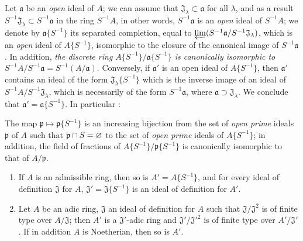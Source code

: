 \begin{env}[7.6.9]
\label{0.7.6.9}
Let $\mathfrak{a}$ be an \emph{open} ideal of $A$; we can assume that
$\mathfrak{J}_\lambda\subset\mathfrak{a}$ for all $\lambda$, and as a result
$S^{-1}\mathfrak{J}_\lambda\subset S^{-1}\mathfrak{a}$ in the ring $S^{-1}A$, in other words,
$S^{-1}\mathfrak{a}$ is an \emph{open} ideal of $S^{-1}A$; we denote by $\mathfrak{a}\{S^{-1}\}$ its
separated completion, equal to $\varprojlim(S^{-1}\mathfrak{a}/S^{-1}\mathfrak{J}_\lambda)$, which is
an \emph{open} ideal of $A\{S^{-1}\}$, isomorphic to the closure of the canonical image of
$S^{-1}\mathfrak{a}$. In addition, \emph{the discrete ring $A\{S^{-1}\}/\mathfrak{a}\{S^{-1}\}$ is
canonically isomorphic to $S^{-1}A/S^{-1}\mathfrak{a}=S^{-1}(A/\mathfrak{a})$}. Conversely, if
$\mathfrak{a}'$ is an open ideal of $A\{S^{-1}\}$, then $\mathfrak{a}'$ contains an ideal of the
form $\mathfrak{J}_\lambda\{S^{-1}\}$ which is the inverse image of an ideal of
$S^{-1}A/S^{-1}\mathfrak{J}_\lambda$, which is necessarily  of the
form $S^{-1}\mathfrak{a}$, where $\mathfrak{a}\supset\mathfrak{J}_\lambda$. We conclude that
$\mathfrak{a}'=\mathfrak{a}\{S^{-1}\}$. In particular :
\end{env}

\begin{proposition}[7.6.10]
\label{0.7.6.10}
The map $\mathfrak{p}\mapsto\mathfrak{p}\{S^{-1}\}$ is an increasing bijection from the set of
\emph{open prime} ideals $\mathfrak{p}$ of $A$ such that $\mathfrak{p}\cap S=\varnothing$ to the set
of \emph{open prime} ideals
of $A\{S^{-1}\}$; in addition, the field of fractions of $A\{S^{-1}\}/\mathfrak{p}\{S^{-1}\}$ is
canonically isomorphic to that of $A/\mathfrak{p}$.
\end{proposition}

\begin{proposition}[7.6.11]
\label{0.7.6.11}
\medskip\noindent
\begin{enumerate}[label=\emph{(\roman*)}]
  \item If $A$ is an admissible ring, then so is $A'=A\{S^{-1}\}$, and for every ideal
    of definition $\mathfrak{J}$ for $A$, $\mathfrak{J}'=\mathfrak{J}\{S^{-1}\}$ is an ideal of
    definition for $A'$.
  \item Let $A$ be an adic ring, $\mathfrak{J}$ an ideal of definition for $A$ such that
    $\mathfrak{J}/\mathfrak{J}^2$ is of finite type over $A/\mathfrak{J}$; then $A'$ is a
    $\mathfrak{J}'$-adic ring and $\mathfrak{J}'/{\mathfrak{J}'}^2$ is of finite type over
    $A'/\mathfrak{J}'$. If in addition $A$ is Noetherian, then so is $A'$.
\end{enumerate}
\end{proposition}

